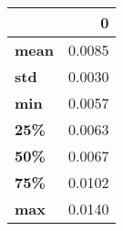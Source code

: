 \begin{tabular}{lr}
\toprule
{} &       0 \\
\midrule
\textbf{mean} &  0.0085 \\
\textbf{std } &  0.0030 \\
\textbf{min } &  0.0057 \\
\textbf{25\% } &  0.0063 \\
\textbf{50\% } &  0.0067 \\
\textbf{75\% } &  0.0102 \\
\textbf{max } &  0.0140 \\
\bottomrule
\end{tabular}
